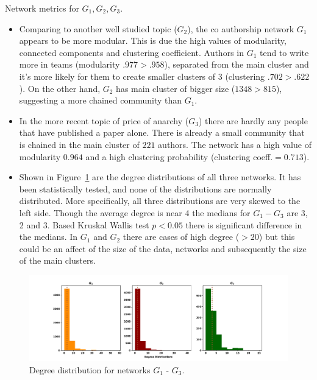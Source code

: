 \documentclass{article}
\theoremstyle{definition}
\begin{document}
\begin{table}[!hbtp]
    \centering
    \resizebox{\textwidth}{!}{
    }
    \caption{Network metrics for \(G_1, G_2, G_3\).}\label{table:summary_other_networks}
\end{table}

\begin{itemize}
    \item Comparing to another well studied topic (\(G_2\)), the co authorship
    network \(G_1\) appears to be more modular. This is due the high values of
    modularity, connected components and clustering coefficient. Authors in \(G_1\)
    tend to write more in teams (modularity $.977 > .958$), separated from the
    main cluster and it's more likely for them to create smaller clusters of 3
    (clustering $.702 > .622$). On the other hand, \(G_2\) has main cluster
    of bigger size ($1348 > 815$), suggesting a more chained community than \(G_1\).
    \item In the more recent topic of price of anarchy (\(G_3\)) there are hardly
    any people that have published a paper alone. There is already a small community
    that is chained in the main cluster of $221$ authors. The network has a high value
    of modularity $0.964$ and  a high clustering probability (clustering
    coeff.$=0.713$).
    \item Shown in Figure~\ref{fig:degree_distrs} are the degree distributions of
    all three networks. It has been statistically tested, and none of the distributions
    are normally distributed. More specifically, all three distributions are
    very skewed to the left side. Though the average degree is near 4 the medians
    for \(G_1 - G_3\) are 3, 2 and 3. Based Kruskal Wallis test \(p< 0.05\) there
    is significant difference in the medians. In \(G_1\) and \(G_2\) there are cases
    of high degree (\(> 20\)) but this could be an affect of the size of the data,
    networks and subsequently the size of the main clusters.
\end{itemize}


\begin{figure}[!hbtp]
    \centering
    \includegraphics[width=\textwidth]{./assets/images/networks_ditributions.pdf}
    \caption{Degree distribution for networks \(G_1\) - \(G_3\).}\label{fig:degree_distrs}
\end{figure}
\end{document}
